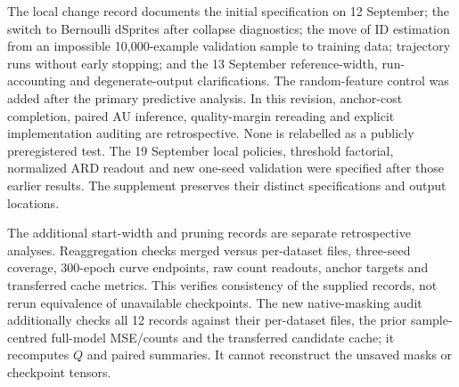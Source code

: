 \documentclass[make,article,submit,pdftex,moreauthors]{Definitions/mdpi}
\begin{document}
The local change record documents the initial specification on
12 September; the switch to Bernoulli dSprites after collapse diagnostics;
the move of ID estimation from an impossible 10,000-example validation
sample to training data; trajectory runs without early stopping; and
the 13 September reference-width, run-accounting and degenerate-output
clarifications. The random-feature control was added after the primary
predictive analysis. In this revision, anchor-cost completion, paired AU
inference, quality-margin rereading and explicit implementation auditing
are retrospective. None is relabelled as a publicly preregistered test.
The 19 September local policies, threshold factorial, normalized ARD
readout and new one-seed validation were specified after those earlier
results. The supplement preserves their distinct specifications and
output locations.

The additional start-width and pruning records are separate retrospective
analyses. Reaggregation checks merged versus per-dataset files, three-seed
coverage, 300-epoch curve endpoints, raw count readouts, anchor targets
and transferred cache metrics. This verifies consistency of the supplied
records, not rerun equivalence of unavailable checkpoints. The new
native-masking audit additionally checks all 12 records against their
per-dataset files, the prior sample-centred full-model MSE/counts and
the transferred candidate cache; it recomputes $Q$ and paired summaries.
It cannot reconstruct the unsaved masks or checkpoint tensors.
\end{document}
